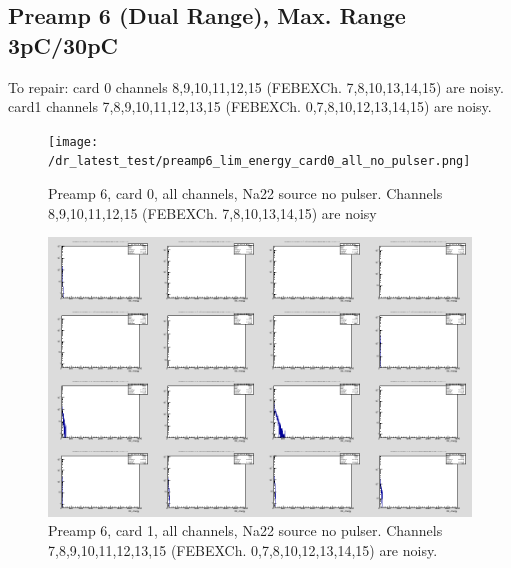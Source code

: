 \documentclass{report}
\begin{document}
\subsection{Preamp 6 (Dual Range), Max. Range 3pC/30pC}
To repair: card 0 channels 8,9,10,11,12,15 (FEBEXCh. 7,8,10,13,14,15) are noisy. card1 channels 7,8,9,10,11,12,13,15 (FEBEXCh. 0,7,8,10,12,13,14,15) are noisy.
\begin{figure}[!htb]
  \texttt{[image: /dr\_latest\_test/preamp6\_lim\_energy\_card0\_all\_no\_pulser.png]}
  \caption{Preamp 6, card 0, all channels, Na22 source  no pulser. Channels 8,9,10,11,12,15 (FEBEXCh. 7,8,10,13,14,15) are noisy }
\end{figure}

\begin{figure}[!htb]
  \includegraphics[width=\linewidth]{dr_latest_test/preamp6_lim_energy_card1_all_no_pulser.png}
  \caption{Preamp 6, card 1, all channels, Na22 source  no pulser. Channels 7,8,9,10,11,12,13,15 (FEBEXCh. 0,7,8,10,12,13,14,15) are noisy.}
\end{figure}
\newpage
\clearpage
\end{document}
